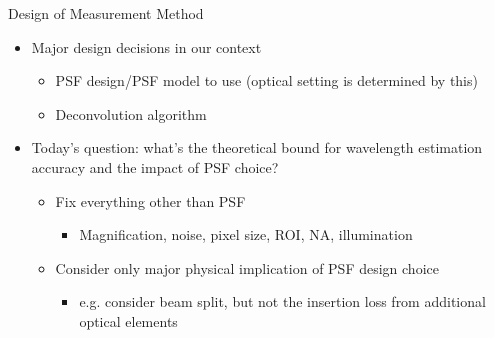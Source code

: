 \documentclass[t]{beamer}
\begin{document}
\begin{frame}{
        Design of Measurement Method
}
    \begin{itemize}
         \item   Major design decisions in our context
    \begin{itemize}
         \item   PSF design/PSF model to use (optical setting is determined by this)
         \item   Deconvolution algorithm
    \end{itemize}
    \vspace{1em}
         \item   Today's question: what's the theoretical bound for wavelength estimation accuracy and the impact of PSF choice?
    \begin{itemize}
         \item   Fix everything other than PSF 
    \begin{itemize}
         \item   Magnification, noise, pixel size, ROI, NA, illumination
    \end{itemize}
         \item   Consider only major physical implication of PSF design choice 
    \begin{itemize}
         \item   e.g. consider beam split, but not the insertion loss from additional optical elements
    \end{itemize}
    \end{itemize}
    \end{itemize}
\end{frame}
\end{document}
